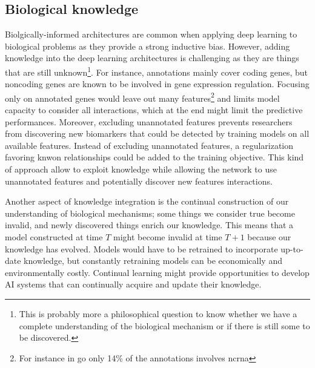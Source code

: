 \documentclass[../main.tex]{subfiles}
\begin{document}
	\subsection{Biological knowledge}\label{sec:persp_knwoledged}
		Biolgically-informed architectures are common when applying deep learning to biological problems as they provide a strong inductive bias.
		However, adding knowledge into the deep learning architectures is challenging as they are things that are still unknown\footnote{This is probably more a philosophical question to know whether we have a complete understanding of the biological mechanism or if there is still some to be discovered.}.
		For instance, annotations mainly cover coding genes, but noncoding genes are known to be involved in gene expression regulation.
		Focusing only on annotated genes would leave out many features\footnote{For instance in \gls{go} only 14\% of the annotations involves \gls{ncrna}} and limits model capacity to consider all interactions, which at the end might limit the predictive performances.
		Moreover, excluding unannotated features prevents researchers from discovering new biomarkers that could be detected by training models on all available features.
		Instead of excluding unannotated features, a regularization favoring knwon relationships could be added to the training objective.
		This kind of approach allow to exploit knowledge while allowing the network to use unannotated features and potentially discover new features interactions.

		Another aspect of knowledge integration is the continual construction of our understanding of biological mechanisms; some things we consider true become invalid, and newly discovered things enrich our knowledge.
		This means that a model constructed at time \(T\) might become invalid at time \(T+1\) because our knowledge has evolved.
		Models would have to be retrained to incorporate up-to-date knowledge, but constantly retraining models can be economically and environmentally costly.
		Continual learning might provide opportunities to develop AI systems that can continually acquire and update their knowledge\cite{wang2024comprehensivesurveycontinuallearning}.
\end{document}
